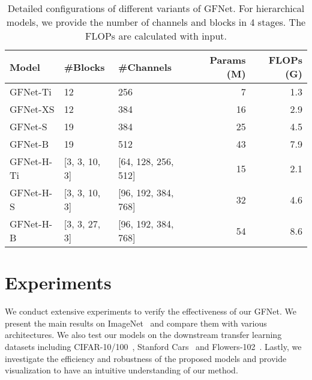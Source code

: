 \documentclass{article}
\numberwithin{equation}{section}
\begin{document}
\begin{table}[t]
  \centering
\caption{Detailed configurations of different variants of GFNet. For hierarchical models, we provide the number of channels and blocks in 4 stages. The FLOPs are calculated with  input.} \vspace{5pt}
    \begin{tabu}to\toprule
    Model & \#Blocks &  \#Channels & Params (M) & FLOPs (G)  \\ \midrule
    GFNet-Ti &  12 & 256  & 7 & 1.3\\
    GFNet-XS &  12 & 384  & 16 & 2.9\\
    GFNet-S &  19 & 384  & 25 & 4.5\\
    GFNet-B &  19 & 512  & 43 & 7.9\\
      \midrule
    GFNet-H-Ti &  [3, 3, 10, 3] & [64, 128, 256, 512]  & 15 & 2.1\\
    GFNet-H-S &  [3, 3, 10, 3] & [96, 192, 384, 768]  & 32 & 4.6\\
    GFNet-H-B &  [3, 3, 27, 3] & [96, 192, 384, 768]  & 54 & 8.6\\
      \bottomrule
    \end{tabu}\label{tab:arch} 
\end{table}

\section{Experiments}

We conduct extensive experiments to verify the effectiveness of our GFNet. We present the main results on ImageNet~\cite{deng2009imagenet} and compare them with various architectures. We also test our models on the downstream transfer learning datasets including CIFAR-10/100~\cite{cifar}, Stanford Cars~\cite{cars} and  Flowers-102~\cite{flower}. Lastly, we investigate the efficiency and robustness of the proposed models and provide visualization to have an intuitive understanding of our method.
\end{document}
